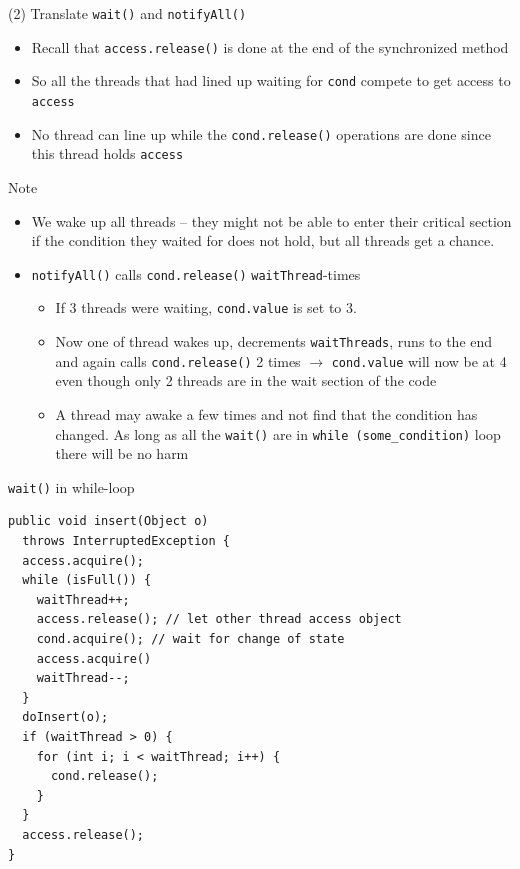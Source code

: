 \begin{frame}{(2) Translate \lstinline!wait()! and \lstinline!notifyAll()!}
  \begin{itemize}
  \item Recall that \lstinline!access.release()! is done at the end of
    the synchronized method
  \item So all the threads that had lined up waiting for
    \lstinline!cond! compete to get access to \lstinline!access!
  \item No thread can line up while the \lstinline!cond.release()!
    operations are done since this thread holds \lstinline!access!
  \end{itemize}
\end{frame}

\begin{frame}{Note}
  \begin{itemize}
  \item We wake up all threads -- they might not be able to enter
    their critical section if the condition they waited for does not
    hold, but all threads get a chance.
  \item \lstinline!notifyAll()! calls \lstinline!cond.release()!
    \lstinline!waitThread!-times
    \begin{itemize}
    \item If 3 threads were waiting, \lstinline!cond.value! is set to 3.
    \item Now one of thread wakes up, decrements
      \lstinline!waitThreads!, runs to the end and again calls
      \lstinline!cond.release()! 2 times $\rightarrow$
      \lstinline!cond.value! will now be at 4 even though only 2
      threads are in the wait section of the code
    \item A thread may awake a few times and not find that the
      condition has changed. As long as all the \lstinline!wait()! are
      in \lstinline!while (some_condition)! loop there will be no harm
    \end{itemize}
  \end{itemize}
\end{frame}

\begin{frame}[fragile]{\lstinline!wait()! in while-loop}
\begin{lstlisting}[basicstyle=\fontsize{9}{11}\selectfont\ttfamily]
public void insert(Object o) 
  throws InterruptedException {
  access.acquire();
  while (isFull()) {
    waitThread++;
    access.release(); // let other thread access object
    cond.acquire(); // wait for change of state
    access.acquire()
    waitThread--;
  }
  doInsert(o);	
  if (waitThread > 0) { 
    for (int i; i < waitThread; i++) {
      cond.release(); 
    } 
  }
  access.release(); 
}
\end{lstlisting}
\end{frame}


